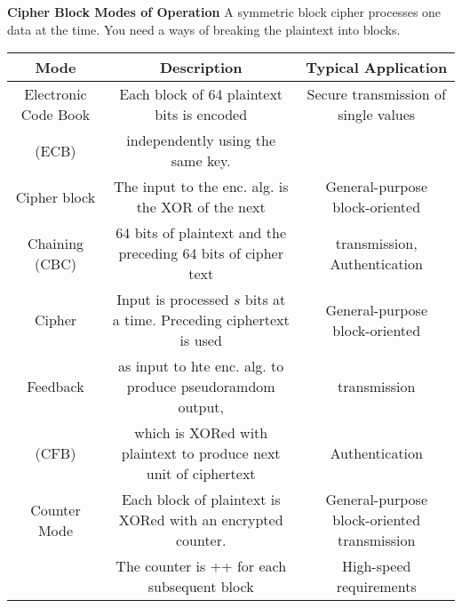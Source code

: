 \documentclass[a4paper,1pt]{article}
\begin{document}
{\bf Cipher Block Modes of Operation} %
\label{sub:Cipher Block Modes of Operation}
A symmetric block cipher processes one data at the time. You need a ways of breaking the plaintext into blocks.  \\
\begin{tabular}{| c | c | c|}
  \hline
  {\bf Mode} & {\bf Description } & {\bf Typical Application} \\
  \hline
  Electronic Code Book & Each block of 64 plaintext bits is encoded & Secure transmission of single values \\
  (ECB) & independently using the same key. & \\
  \hline
  Cipher block &  The input to the enc. alg. is the XOR  of the next  & General-purpose block-oriented \\
  Chaining (CBC) &64 bits of plaintext and the preceding 64 bits of cipher text& transmission, Authentication \\
  \hline
  Cipher & Input is processed $s$ bits at a time. Preceding ciphertext is used & General-purpose block-oriented \\
  Feedback &as input to hte enc. alg. to produce pseudoramdom output, & transmission \\
  (CFB) & which is XORed with plaintext to produce next unit of ciphertext  & Authentication \\
  \hline
  Counter Mode & Each block of plaintext is XORed with an encrypted counter. & General-purpose block-oriented transmission \\
  & The counter is ++ for each subsequent block & High-speed requirements \\
  \hline
\end{tabular}
\end{document}
